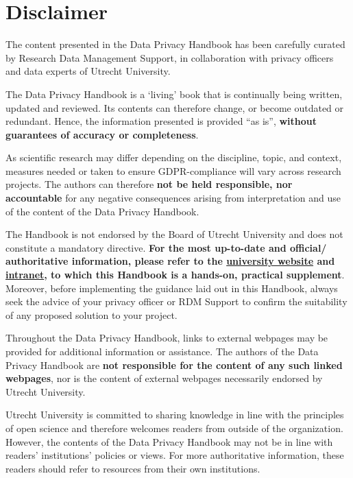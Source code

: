 \documentclass[
]{book}
\begin{document}
\hypertarget{disclaimer}{%
\section{Disclaimer}\label{disclaimer}}

The content presented in the Data Privacy Handbook has been carefully curated by
Research Data Management Support, in collaboration with privacy officers and
data experts of Utrecht University.

The Data Privacy Handbook is a `living' book that is continually being written,
updated and reviewed. Its contents can therefore change, or become outdated or
redundant. Hence, the information presented is provided ``as is'', \textbf{without
guarantees of accuracy or completeness}.

As scientific research may differ depending on the discipline, topic, and
context, measures needed or taken to ensure GDPR-compliance will vary across
research projects. The authors can therefore \textbf{not be held responsible, nor
accountable} for any negative consequences arising from interpretation and use
of the content of the Data Privacy Handbook.

The Handbook is not endorsed by the Board of Utrecht University and does not
constitute a mandatory directive. \textbf{For the most up-to-date and official/
authoritative information, please refer to the
\href{https://www.uu.nl/en/research/research-data-management}{university website}
and \href{https://intranet.uu.nl/en/knowledge-base/privacy-at-uu}{intranet},
to which this Handbook is a hands-on, practical supplement}. Moreover, before
implementing the guidance laid out in this Handbook, always seek the advice of
your privacy officer or RDM Support to confirm the suitability of any proposed
solution to your project.

Throughout the Data Privacy Handbook, links to external webpages may be provided
for additional information or assistance. The authors of the Data Privacy
Handbook are \textbf{not responsible for the content of any such linked webpages}, nor
is the content of external webpages necessarily endorsed by Utrecht University.

Utrecht University is committed to sharing knowledge in line with the principles
of open science and therefore welcomes readers from outside of the organization.
However, the contents of the Data Privacy Handbook may not be in line with readers'
institutions' policies or views. For more authoritative information, these
readers should refer to resources from their own institutions.
\end{document}
